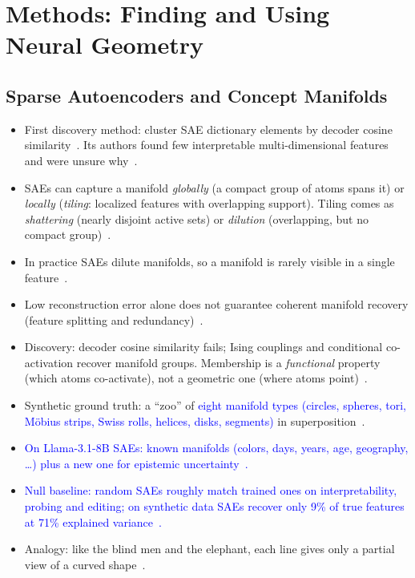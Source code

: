 \documentclass[11pt,a4paper]{article}
\newcommand{\fromextra}[1]{\textcolor{blue}{#1}}
\newcommand{\fromnotes}[1]{\textcolor{green!50!black}{#1}}
\newcommand{\fromextra}[1]{#1}
\newcommand{\fromnotes}[1]{#1}
\begin{document}
\section{Methods: Finding and Using Neural Geometry}

\subsection{Sparse Autoencoders and Concept Manifolds}
\begin{itemize}
  \item First discovery method: cluster SAE dictionary elements by decoder cosine similarity~\cite{engels2025notall}. Its authors found few interpretable multi-dimensional features and were unsure why~\cite{engels2025notall}.
  \item SAEs can capture a manifold \emph{globally} (a compact group of atoms spans it) or \emph{locally} (\emph{tiling}: localized features with overlapping support). Tiling comes as \emph{shattering} (nearly disjoint active sets) or \emph{dilution} (overlapping, but no compact group)~\cite{bhalla2026saemanifolds}.
  \item In practice SAEs dilute manifolds, so a manifold is rarely visible in a single feature~\cite{bhalla2026saemanifolds}.
  \item Low reconstruction error alone does not guarantee coherent manifold recovery (feature splitting and redundancy)~\cite{bhalla2026saemanifolds}.
  \item Discovery: decoder cosine similarity fails; Ising couplings and conditional co-activation recover manifold groups. Membership is a \emph{functional} property (which atoms co-activate), not a geometric one (where atoms point)~\cite{bhalla2026saemanifolds}.
  \item Synthetic ground truth: a \enquote{zoo} of \fromextra{eight manifold types (circles, spheres, tori, Möbius strips, Swiss rolls, helices, disks, segments)} in superposition~\cite{bhalla2026saemanifolds}.
  \item \fromextra{On Llama-3.1-8B SAEs: known manifolds (colors, days, years, age, geography, \dots) plus a new one for epistemic uncertainty~\cite{bhalla2026saemanifolds}.}
  \item \fromextra{Null baseline: random SAEs roughly match trained ones on interpretability, probing and editing; on synthetic data SAEs recover only 9\% of true features at 71\% explained variance~\cite{korznikov2026sanity}.}
  \item \fromnotes{Analogy: like the blind men and the elephant, each line gives only a partial view of a curved shape~\cite{bhalla2026blog}.}
\end{itemize}
\end{document}
